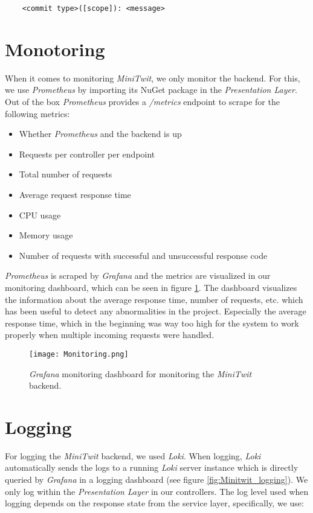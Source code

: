 \begin{verbatim}
    <commit type>([scope]): <message>
\end{verbatim}

\section{Monotoring}

When it comes to monitoring \textit{MiniTwit}, we only monitor the backend. For this, we use \textit{Prometheus} by importing its NuGet package in the \textit{Presentation Layer}. Out of the box \textit{Prometheus} provides a \textit{/metrics} endpoint to scrape for the following metrics:

\begin{itemize}
    \item Whether \textit{Prometheus} and the backend is up
    \item Requests per controller per endpoint
    \item Total number of requests
    \item Average request response time
    \item CPU usage
    \item Memory usage
    \item Number of requests with successful and unsuccessful response code
\end{itemize}

\textit{Prometheus} is scraped by \textit{Grafana} and the metrics are visualized in our monitoring dashboard, which can be seen in figure \ref{fig:Minitwit_monitoring}. The dashboard visualizes the information about the average response time, number of requests, etc. which has been useful to detect any abnormalities in the project. Especially the average response time, which in the beginning was way too high for the system to work properly when multiple incoming requests were handled.

\begin{figure}[H]
    \centering
    \texttt{[image: Monitoring.png]}
    \caption{\textit{Grafana} monitoring dashboard for monitoring the \textit{MiniTwit} backend.}
    \label{fig:Minitwit_monitoring}
\end{figure}

\section{Logging}

For logging the \textit{MiniTwit} backend, we used \textit{Loki}. When logging, \textit{Loki} automatically sends the logs to a running \textit{Loki} server instance which is directly queried by \textit{Grafana} in a logging dashboard (see figure \ref{fig:Minitwit_logging}). We only log within the \textit{Presentation Layer} in our controllers. The log level used when logging depends on the response state from the service layer, specifically, we use:

